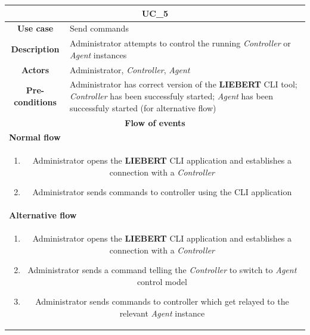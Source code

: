 \documentclass[12pt,a4paper,table]{article}
\begin{document}
            \vspace{0.5cm}
            \noindent
            \begin{longtable}{ |c|p{11.8cm}| }
                \hline
                \multicolumn{2}{|c|}{\cellcolor{lime} \textbf{UC\_5}}\\ \hline
                \cellcolor[gray]{0.9} \textbf{Use case} & Send commands\\ \hline
                \cellcolor[gray]{0.9} \textbf{Description} & Administrator attempts to control the running \textit{Controller} or \textit{Agent} instances\\ \hline
                \cellcolor[gray]{0.9} \textbf{Actors} & Administrator, \textit{Controller}, \textit{Agent}\\ \hline
                \cellcolor[gray]{0.9} \textbf{Pre-conditions} & Administrator has correct version of the \textbf{LIEBERT} CLI tool; \textit{Controller} has been successfuly started; \textit{Agent} has been successfuly started (for alternative flow)\\ \hline
                \multicolumn{2}{|c|}{\cellcolor[gray]{0.9} \textbf{Flow of events}}\\ \hline
                \multicolumn{2}{|l|}{\cellcolor[gray]{0.9} \textbf{Normal flow}}\\ \hline
                \multicolumn{2}{|p{14cm}|}{
                    \begin{enumerate}
                        \item Administrator opens the \textbf{LIEBERT} CLI application and establishes a connection with a \textit{Controller}
                        \item Administrator sends commands to controller using the CLI application
                    \end{enumerate}
                }\\ \hline
                \multicolumn{2}{|l|}{\cellcolor[gray]{0.9} \textbf{Alternative flow}}\\ \hline
                \multicolumn{2}{|p{14cm}|}{
                    \begin{enumerate}
                        \item Administrator opens the \textbf{LIEBERT} CLI application and establishes a connection with a \textit{Controller}
                        \item Administrator sends a command telling the \textit{Controller} to switch to \textit{Agent} control model
                        \item Administrator sends commands to controller which get relayed to the relevant \textit{Agent} instance

\end{enumerate}}
\end{longtable}
\end{document}
